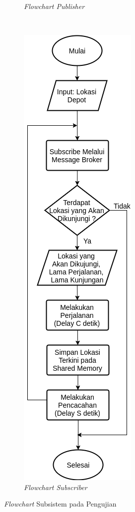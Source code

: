 \begin{figure}[!]
\begin{subfigure}[t]{0.39\textwidth}
		\caption{\textit{Flowchart Publisher}}
		\label{fig:test-flowchart-normal-global-publisher}
	\end{subfigure}%
	~
	\begin{subfigure}[t]{0.31\textwidth}
		\centering
		\includegraphics[width=\textwidth]{Resources/Images/test-flowchart-normal-global-subscriber}
		\caption{\textit{Flowchart Subscriber}}
		\label{fig:test-flowchart-normal-global-subscriber}
	\end{subfigure}
	\captionsetup{format=hang}
	\caption{\textit{Flowchart} Subsistem pada Pengujian}
	\label{fig:test-flowchart-normal-global}
\end{figure}


